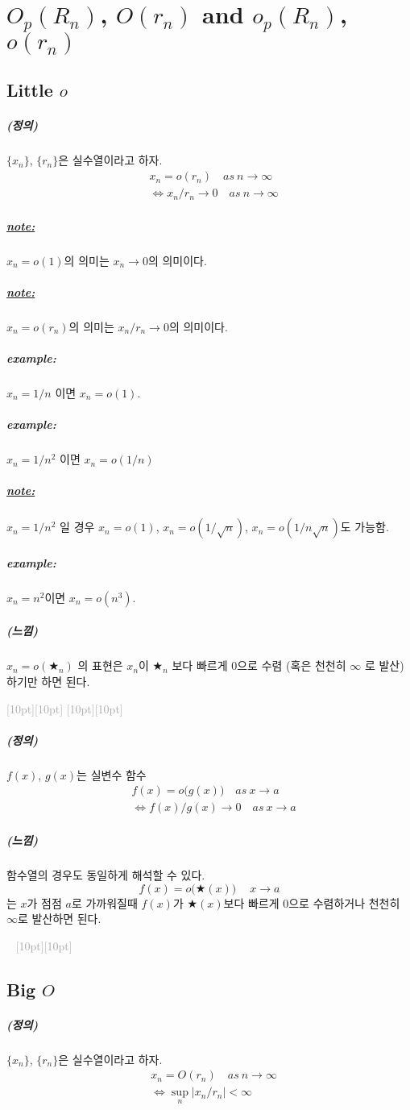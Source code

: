 \documentclass[12pt,oneside,english]{book}
\newcommand{\dash}{\vspace{2em}\noindent \textcolor{darkgray}{\hrulefill~ \raisebox{-2.5pt}[10pt][10pt]{\leafright \decofourleft \decothreeleft  \aldineright \decotwo \floweroneleft \decoone   \floweroneright \decotwo \aldineleft\decothreeright \decofourright \leafleft} ~  \hrulefill \\ \vspace{2em}}}
\newcommand{\rdash}{\noindent \textcolor{darkgray}{ \raisebox{-1.9pt}[10pt][10pt]{\leafright} \hrulefill \raisebox{-1.9pt}[10pt][10pt]{\leafright \decofourleft \decothreeleft  \aldineright \decotwo \floweroneleft \decoone}}}
\def\dfn{\paragraph{\large(정의)}\large}
\def\fl{\paragraph{\large(느낌)}\large}
\def\note{\paragraph{\large\textit{\underline{note:}}}\large}
\def\ex{\paragraph{\large\textit{example:}}\large}
\begin{document}
\chapter{$O_p(R_n)$, $O(r_n)$ and $o_p(R_n)$, $o(r_n)$}
\section{Little $o$}

\dfn $\{x_n\}$, $\{r_n\}$은 실수열이라고 하자. 
\begin{align*}
& x_n=o(r_n) \quad as~  n\to \infty \\
&\Longleftrightarrow x_n/r_n \to 0 \quad as ~ n \to \infty 
\end{align*}

\note $x_n=o(1)$의 의미는 $x_n\to 0$의 의미이다. 

\note $x_n=o(r_n)$의 의미는 $x_n/r_n \to 0$의 의미이다. 

\ex $x_n=1/n$ 이면 $x_n=o(1)$. 

\ex $x_n=1/n^2$ 이면 $x_n=o(1/n)$

\note $x_n=1/n^2$ 일 경우 $x_n=o(1)$, $x_n=o(1/\sqrt{n})$, $x_n=o(1/n\sqrt{n})$도 가능함. 

\ex $x_n=n^2$이면 $x_n=o(n^3)$. 

\fl $x_n=o(\bigstar_n)$ 의 표현은 $x_n$이 $\bigstar_n$ 보다 빠르게 $0$으로 수렴 (혹은 천천히 $\infty$ 로 발산) 하기만 하면 된다. 

\rdash

\dfn $f(x)$, $g(x)$는 실변수 함수 
\begin{align*}
& f(x)=o\big(g(x)\big) \quad as~  x\to a \\
&\Longleftrightarrow f(x)/g(x) \to 0 \quad as ~ x \to a
\end{align*}

\fl 함수열의 경우도 동일하게 해석할 수 있다. 
\[
f(x)=o\big(\bigstar(x)\big) \quad ~ x \to a
\]
는 $x$가 점점 $a$로 가까워질때 $f(x)$가 $\bigstar(x)$보다 빠르게 $0$으로 수렴하거나 천천히 $\infty$로 발산하면 된다. 

\dash

\section{Big $O$}

\dfn $\{x_n\}$, $\{r_n\}$은 실수열이라고 하자. 
\begin{align*}
& x_n=O(r_n) \quad as~  n\to \infty \\
&\Longleftrightarrow \sup_n |x_n/r_n| < \infty 
\end{align*}
\end{document}
